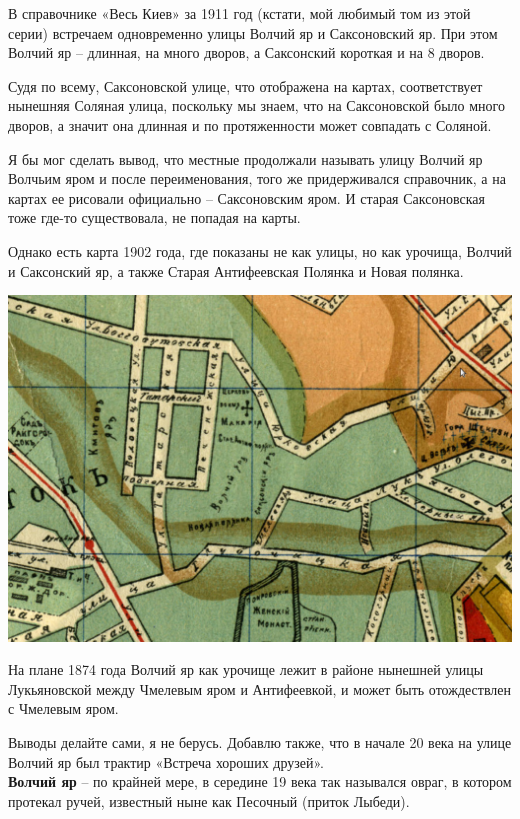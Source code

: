 В справочнике «Весь Киев» за 1911 год (кстати, мой любимый том из этой серии) встречаем одновременно улицы Волчий яр и Саксоновский яр. При этом Волчий яр – длинная, на много дворов, а Саксонский короткая и на 8 дворов.

Судя по всему, Саксоновской улице, что отображена на картах, соответствует нынешняя Соляная улица, поскольку мы знаем, что на Саксоновской было много дворов, а значит она длинная и по протяженности может совпадать с Соляной.

Я бы мог сделать вывод, что местные продолжали называть улицу Волчий яр Волчьим яром и после переименования, того же придерживался справочник, а на картах ее рисовали официально – Саксоновским яром. И старая Саксоновская тоже где-то существовала, не попадая на карты. 

Однако есть карта 1902 года, где показаны не как улицы, но как урочища, Волчий и Саксонский яр, а также Старая Антифеевская Полянка и Новая полянка.

\begin{center}
\includegraphics[width=\linewidth]{rpix/volch01.jpg}
\end{center}

На плане 1874 года Волчий яр как урочище лежит в районе нынешней улицы Лукьяновской между Чмелевым яром и Антифеевкой, и может быть отождествлен с Чмелевым яром.

Выводы делайте сами, я не берусь. Добавлю также, что в начале 20 века на улице Волчий яр был трактир «Встреча хороших друзей».\\

\textbf{Волчий яр} – по крайней мере, в середине 19 века так назывался овраг, в котором протекал ручей, известный ныне как Песочный (приток Лыбеди).

